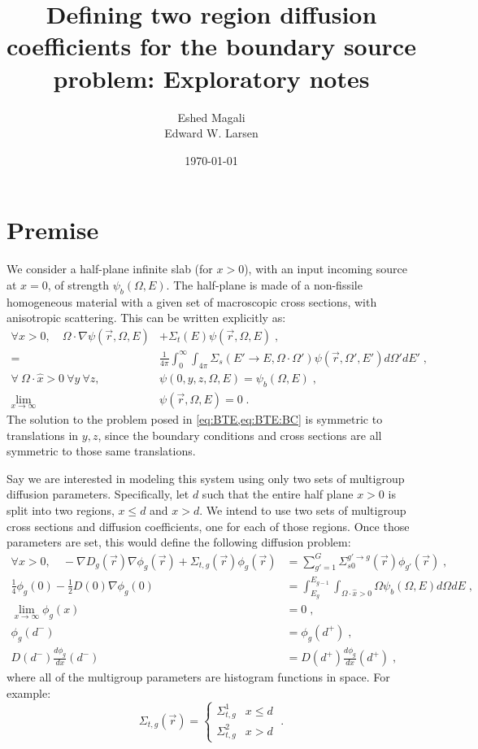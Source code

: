 \documentclass[a4paper,letterpaper,12pt,oneside,draft]{article}
\title{Defining two region diffusion coefficients for the boundary source problem: Exploratory notes}
\author{Eshed Magali \\ Edward W. Larsen}
\date{\today}
\newcommand{\eec}{\;,}
\newcommand{\eep}{\;.}
\newcommand{\intg}[2][g]{\ensuremath{\int_{E_{#1}}^{E_{#1-1}} #2 dE}}
\newcommand{\vr}{\ensuremath{\vec{r}}}
\newcommand{\psif}[1][]{\psi(\vr,\Omega#1,E#1)}
\begin{document}
\maketitle
\section{Premise}
    We consider a half-plane infinite slab (for $x>0$), with an input incoming source at $x=0$, of strength $\psi_b(\Omega,E)$. 
    The half-plane is made of a non-fissile homogeneous material with a given set of macroscopic cross sections, with anisotropic scattering. 
    This can be written explicitly as:
    \begin{align}
    \nonumber
        \forall x>0,\quad \Omega\cdot\nabla\psif &+ \Sigma_t(E)\psif \eec \\ 
    \label{eq:BTE}
        =& \frac{1}{4\pi}\int_0^\infty\int_{4\pi}\Sigma_{s}(E'\to E,\Omega\cdot\Omega')\psif[']d\Omega'dE' \eec\\
    \label{eq:BTE:BC}
        \forall\  \Omega\cdot\hat{x}>0\  \forall y\  \forall z, \quad &
        \psi(0,y,z,\Omega,E) = \psi_b(\Omega,E)\eec \\\nonumber
        \lim\limits_{x\to\infty}&\psi(\vr,\Omega,E) = 0 \eep
    \end{align}
    The solution to the problem posed in \cref{eq:BTE,eq:BTE:BC} is symmetric to translations in $y,z$, since the boundary conditions and cross sections are all symmetric to those same translations.
    
    Say we are interested in modeling this system using only two sets of multigroup diffusion parameters. Specifically, let $d$ such that the entire half plane $x>0$ is split into two regions, $x\leq d$ and $x>d$.
    We intend to use two sets of multigroup cross sections and diffusion coefficients, one for each of those regions. Once those parameters are set, this would define the following diffusion problem:
    \begin{align}
        \label{eq:Diff}
            \forall x>0, \quad-\nabla D_g(\vr)\nabla\phi_g(\vr) + \Sigma_{t,g}(\vr)\phi_g(\vr) &= \sum_{g'=1}^G\Sigma_{s0}^{g'\to g}(\vr)\phi_{g'}(\vr) \eec\\
        \label{eq:Diff:BC}
            \frac{1}{4}\phi_g(0) - \frac{1}{2}D(0)\nabla\phi_g(0) &= \intg{\int_{\Omega\cdot\hat{x}>0}\Omega\psi_b(\Omega,E)d\Omega} \eec\\
            \lim\limits_{x\to\infty}\phi_g(x) &= 0 \eec\\
        \label{eq:Diff:IC}
            \phi_g(d^-) &= \phi_g(d^+) \eec\\
            \nonumber
            D(d^-)\frac{d\phi_g}{dx}(d^-) &= D(d^+)\frac{d\phi_g}{dx}(d^+)\eec
    \end{align}
    where all of the multigroup parameters are histogram functions in space.
    For example:
    \begin{equation}
        \label{eq:TotalXS}
        \Sigma_{t,g}(\vr) = \begin{cases} \Sigma_{t,g}^1 & x\leq d \\ \Sigma_{t,g}^2 & x>d\end{cases}\eep
    \end{equation}
    
\end{document}
